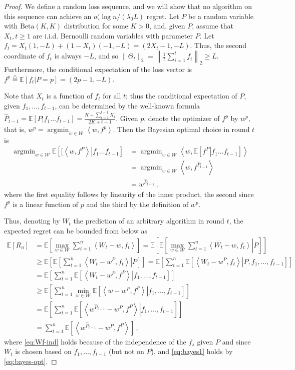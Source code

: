 \documentclass[english]{article}
\newcommand{\cW}{\mathcal{W}}
\newcommand{\hP}{\hat{P}}
\newcommand{\Exp}[1]{\mathbb{E}\left[ #1 \right]}
\newcommand{\Expc}[2]{\mathbb{E}\left[ \left. #1 \right| #2 \right]}
\newcommand{\inner}[1]{\left\langle#1\right\rangle}
\DeclareMathOperator*{\argmin}{argmin}
\begin{document}
\begin{proof}
 We define a random loss sequence, and we will show that no algorithm on this sequence can achieve an $o(\log n/ (\lambda_0 L)$ regret.
	Let $P$ be a random variable with $\mbox{Beta}(K,K)$ distribution for some $K>0$, and, given $P$, assume that $X_t, t \ge 1$ are i.i.d. Bernoulli random variables with parameter $P$. Let $f_t = X_t (1, -L) + (1-X_t) (-1, -L) = (2X_t - 1, -L)$. Thus, the second coordinate of $f_t$ is always $-L$, and so $\|\Theta_t\|_2 = \left\| \tfrac{1}{t} \sum_{i=1}^t f_i \right\|_2 \ge L$. Furthermore, the conditional expectation of the loss vector is $f^p \overset{\triangle}{=} \Expc{f_t}{P=p} = (2p - 1, -L)$. 
	
	Note that $X_t$ is a function of $f_t$ for all $t$; thus the conditional expectation of $P$, given $f_1,\ldots,f_{t-1}$, can be determined by the well-known formula $\hP_{t-1}= \Expc{P}{f_1 \ldots f_{t-1}} = \frac{K+\sum_{i=1}^{t-1} X_i}{2K+t-1}$.
	Given $p$, denote the optimizer of $f^p$ by $w^p$, that is, $w^p = \argmin_{w \in \cW} \inner{w,f^p}$. 	
	Then the Bayesian optimal choice in round $t$ is 
	\begin{align}
	\argmin_{w \in \mathcal W} \Expc{[\inner{w, f^P}}{ f_1\ldots f_{t-1}}
	&= \argmin_{w \in \mathcal W} \inner{w, \Expc{f^P}{f_1 \ldots f_{t-1}}} \nonumber \\
	&= \argmin_{w \in \mathcal W} \inner{w, f^{\hat P_{t-1}}} \nonumber \\
	&= w^{\hat P_{t-1}}\,,
	\label{eq:bayes-opt}
	\end{align}
	where the first equality follows by linearity of the inner product, the second since $f^p$ is a linear function of $p$ and the third
	by the definition of $w^p$.
	
	Thus, denoting by $W_t$ the prediction of an arbitrary algorithm in round $t$, the expected regret can be bounded from below as 
	\begin{align}
	\Exp{R_n}
	&= \Exp{\max_{w \in \cW} \sum_{t=1}^n \inner{W_t - w, f_t}}
	= \Exp{ \Expc{\max_{w \in \cW} \sum_{t=1}^n \inner{W_t - w, f_t}}{P} } \nonumber \\
	& \ge  \Exp{ \Expc{ \sum_{t=1}^n \inner{W_t - w^P, f_t}}{P} } = \Exp{\sum_{t=1}^n  \Expc{ \inner{W_t - w^P, f_t} }{P, f_1,\ldots,f_{t-1}}} \nonumber \\
	& = \Exp{\sum_{t=1}^n  \Expc{ \inner{W_t - w^P, f^P} }{f_1,\ldots,f_{t-1}}} \label{eq:Wf-ind} \\
	& \ge \Exp{\sum_{t=1}^n  \min_{w \in \cW} \Expc{ \inner{w- w^P, f^P} }{f_1,\ldots,f_{t-1}}} \nonumber \\
	& = \Exp{\sum_{t=1}^n  \Expc{ \inner{w^{\hP_{t-1}}- w^P, f^P} }{f_1,\ldots,f_{t-1}}}  \label{eq:bayes1} \\
	& = \sum_{t=1}^n \Exp{\inner{w^{\hP_{t-1}} - w^P, f^P}} \,, \nonumber 
	\end{align}
	where   \eqref{eq:Wf-ind} holds because of the independence of the $f_s$ given $P$ and since $W_t$ is chosen based on $f_1,\ldots,f_{t-1}$ (but not on $P$),
	and \eqref{eq:bayes1} holds by \eqref{eq:bayes-opt}. 
	

\end{proof}
\end{document}
